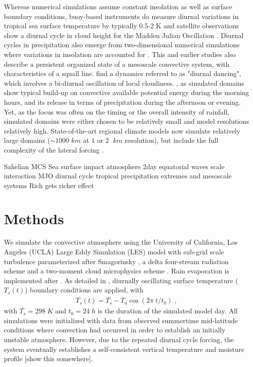 \documentclass[draft,linenumbers]{agujournal2019}
\begin{document}
Whereas numerical simulations assume constant insolation as well as surface boundary conditions, buoy-based instruments do measure diurnal variations in tropical sea surface temperature by typically 0.5-2 K \cite{weller1996surface,johnson1999trimodal} and satellite observations show a diurnal cycle in cloud height for the Madden Julian Oscillation \cite{suzuki2009diurnal,tian2006modulation}.
Diurnal cycles in precipitation also emerge from two-dimensional numerical simulations where variations in insolation are accounted for \cite{liu1998numerical}. 
This and earlier studies\cite{chen1997diurnal} also describe a persistent organized state of a mesoscale convective system, with characteristics of a squall line.
\citet{chen1997diurnal} find a dynamics referred to as "diurnal dancing", which involves a bi-diurnal oscillation of local cloudiness.
\cite{guichard2004modelling,brown2002large,petch2002impact,schlemmer2011diurnal,moseley2016,haerter2018intensified}, as simulated domains show typical build-up on convective available potential energy during the morning hours, and its release in terms of precipitation during the afternoon or evening.
Yet, as the focus was often on the timing or the overall intensity of rainfall, simulated domains were either chosen to be relatively small and model resolutions relatively high. 
State-of-the-art regional climate models now simulate relatively large domains ($\sim 1000$ $km$ at $1$ or $2$ $\;km$ resolution), but include the full complexity of the lateral forcing \cite{ban2015heavy}. 

Sahelian MCS \cite{mathon2001life}
Sea surface impact atmosphere \cite{kawai2007diurnal}
2day equatorial waves \cite{haertel2004dynamics}
scale interaction MJO diurnal cycle \cite{peatman2014propagation}
tropical precipitation extremes and mesoscale systems \cite{rossow2013tropical}
Rich gets richer effect \cite{chou2009evaluating}

\section{Methods}\label{sec:methods}
We simulate the convective atmosphere using the University of California, Los Angeles (UCLA) Large Eddy Simulation (LES) model with sub-grid scale turbulence parameterized after Smagorinsky \cite{smagorinsky1963general}, a delta four-stream radiation scheme \cite{pincus} and a two-moment cloud microphysics scheme \cite{stevens2005}. 
Rain evaporation is implemented after \citet{seifert2006two}.
As detailed in \cite{moseley2016}, diurnally oscillating surface temperature ($T_s(t)$) boundary conditions are applied, with
\begin{eqnarray}
  T_s(t)=\overline{T_{s}}-T_{a} \cos{(2\pi\;t/t_0)}\;,
\end{eqnarray}
\noindent
with $\overline{T_{s}}=298\;K$ and $t_0=24\;h$ is the duration of the simulated model day.
All simulations were initialized with data from observed summertime mid-latitude conditions where convection had occurred in order to establish an initially unstable atmosphere. 
However, due to the repeated diurnal cycle forcing, the system eventually establishes a self-consistent vertical temperature and moisture profile [show this somewhere].
\end{document}
